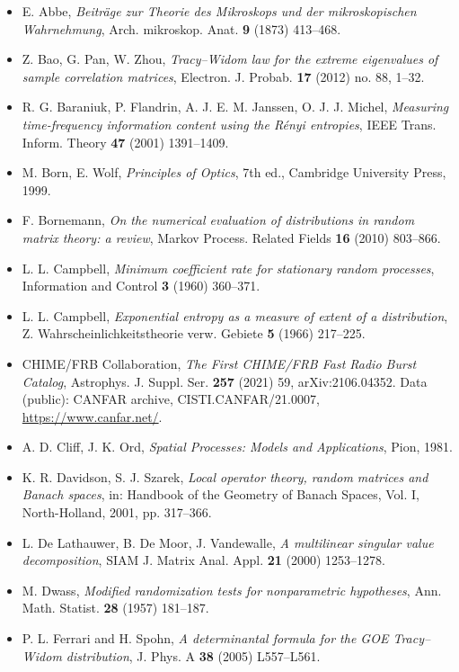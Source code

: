 \documentclass[10pt,letterpaper,twocolumn]{article}
\providecommand{\tightlist}{\setlength{\itemsep}{0pt}\setlength{\parskip}{0pt}}
\begin{document}
\begin{itemize}
\tightlist
\item
  E. Abbe, \emph{Beiträge zur Theorie des Mikroskops und der mikroskopischen Wahrnehmung}, Arch. mikroskop. Anat. \textbf{9} (1873) 413--468.
\item
  Z. Bao, G. Pan, W. Zhou, \emph{Tracy--Widom law for the extreme eigenvalues of sample correlation matrices}, Electron. J. Probab. \textbf{17} (2012) no. 88, 1--32.
\item
  R. G. Baraniuk, P. Flandrin, A. J. E. M. Janssen, O. J. J. Michel, \emph{Measuring time-frequency information content using the Rényi entropies}, IEEE Trans. Inform. Theory \textbf{47} (2001) 1391--1409.
\item
  M. Born, E. Wolf, \emph{Principles of Optics}, 7th ed., Cambridge University Press, 1999.
\item
  F. Bornemann, \emph{On the numerical evaluation of distributions in random matrix theory: a review}, Markov Process. Related Fields \textbf{16} (2010) 803--866.
\item
  L. L. Campbell, \emph{Minimum coefficient rate for stationary random processes}, Information and Control \textbf{3} (1960) 360--371.
\item
  L. L. Campbell, \emph{Exponential entropy as a measure of extent of a distribution}, Z. Wahrsche\allowbreak{}inlichke\allowbreak{}itstheor\allowbreak{}ie verw. Gebiete \textbf{5} (1966) 217--225.
\item
  CHIME/FRB Collaboration, \emph{The First CHIME/FRB Fast Radio Burst Catalog}, Astrophys. J. Suppl. Ser. \textbf{257} (2021) 59, arXiv:2106.04352. Data (public): CANFAR archive, CISTI.CANFAR/21.0007, \url{https://www.canfar.net/}.
\item
  A. D. Cliff, J. K. Ord, \emph{Spatial Processes: Models and Applications}, Pion, 1981.
\item
  K. R. Davidson, S. J. Szarek, \emph{Local operator theory, random matrices and Banach spaces}, in: Handbook of the Geometry of Banach Spaces, Vol. I, North-Holland, 2001, pp. 317--366.
\item
  L. De Lathauwer, B. De Moor, J. Vandewalle, \emph{A multilinear singular value decomposition}, SIAM J. Matrix Anal. Appl. \textbf{21} (2000) 1253--1278.
\item
  M. Dwass, \emph{Modified randomization tests for nonparametric hypotheses}, Ann. Math. Statist. \textbf{28} (1957) 181--187.
\item
  P. L. Ferrari and H. Spohn, \emph{A determinantal formula for the GOE Tracy--Widom distribution}, J. Phys. A \textbf{38} (2005) L557--L561.

\end{itemize}
\end{document}
